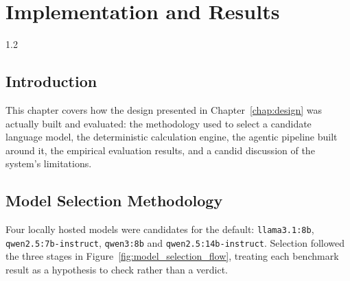 \chapter{Implementation and Results}
\label{chap:implementation}
\begin{spacing}{1.2}
\minitoc
\thispagestyle{MyStyle}
\end{spacing}
\newpage

\section{Introduction}

This chapter covers how the design presented in Chapter~\ref{chap:design}
was actually built and evaluated: the methodology used to select a
candidate language model, the deterministic calculation engine, the
agentic pipeline built around it, the empirical evaluation results, and a
candid discussion of the system's limitations.

\section{Model Selection Methodology}
\label{sec:model_selection_cbam}

Four locally hosted models were candidates for the default:
\texttt{llama3.1:8b}, \texttt{qwen2.5:7b-instruct}, \texttt{qwen3:8b} and
\texttt{qwen2.5:14b-instruct}. Selection followed the three stages in
Figure~\ref{fig:model_selection_flow}, treating each benchmark result as a
hypothesis to check rather than a verdict.

